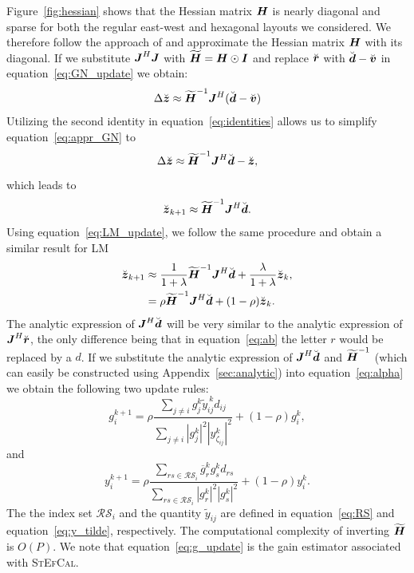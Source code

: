 \documentclass[useAMS,usenatbib]{mn2e}
\newcommand{\bz}{\bmath{z}}
\newcommand{\br}{\bmath{r}}
\newcommand{\bd}{\bmath{d}}
\newcommand{\bv}{\bmath{v}}
\newcommand{\bJ}{\bmath{J}}
\newcommand{\bH}{\bmath{H}}
\newcommand{\bI}{\bmath{I}}
\newcommand{\conj}[1]{\overline{#1}}
\begin{document}
Figure~\ref{fig:hessian} shows that the Hessian matrix $\bH$ is nearly diagonal and sparse for both the regular east-west and hexagonal layouts we considered. We therefore follow the approach of \citet{Smirnov2015} and approximate the Hessian matrix $\bH$ with its diagonal. If we substitute $\bJ^H\bJ$ with $\widetilde{\bH}=\bH\odot\bI$ and replace $\breve{\br}$ with $\breve{\bd} - \breve{\bv}$ in equation~\ref{eq:GN_update} we obtain:
\begin{equation}
\label{eq:appr_GN}
 \Delta \breve{\bz} \approx \widetilde{\bH}^{-1}\bJ^H(\breve{\bd}-\breve{\bv})
\end{equation}
Utilizing the second identity in equation~\ref{eq:identities} allows us to simplify equation~\ref{eq:appr_GN} to
\begin{equation}
  \Delta \breve{\bz} \approx \widetilde{\bH}^{-1}\bJ^H\breve{\bd}-\breve{\bz},
\end{equation}
which leads to
\begin{equation}
 \breve{\bz}_{k+1} \approx \widetilde{\bH}^{-1}\bJ^H\breve{\bd}.
\end{equation}
Using equation~\ref{eq:LM_update}, we follow the same procedure and obtain a similar result for LM
\begin{align}
\breve{\bz}_{k+1} &\approx \frac{1}{1+\lambda}\widetilde{\bH}^{-1}\bJ^H\breve{\bd} + \frac{\lambda}{1+\lambda} \breve{\bz}_k,\label{eq:lambda}\\
 &= \rho \widetilde{\bH}^{-1}\bJ^H\breve{\bd} + (1-\rho)\breve{\bz}_k. \label{eq:alpha}  
\end{align}
The analytic expression of $\bJ^H\breve{\bd}$ will be very similar to the analytic 
expression of $\bJ^H\breve{\br}$, the only difference being that in equation~\ref{eq:ab} the letter $r$ would be replaced by a $d$. If we substitute the analytic expression
of $\bJ^H\breve{\bd}$ and $\widetilde{\bH}^{-1}$ (which can easily be constructed using Appendix~\ref{sec:analytic}) into equation~\ref{eq:alpha} we obtain the following two update rules:
\begin{equation}
\label{eq:g_update}
g_{i}^{k+1} = \rho \frac{\sum_{j\neq i} g_j^k \widetilde{y}_{ij}^{~\!\!k} d_{ij}}{\sum_{j\neq i} |g_j^k|^2|y_{\zeta_{ij}}^k|^2} + (1-\rho) g_i^k, 
\end{equation}
and
\begin{equation}
\label{eq:y_update}
y_{i}^{k+1} = \rho \frac{\sum_{rs \in \mathcal{RS}_i} \conj{g}_r^k g_s^k d_{rs}}{\sum_{rs \in \mathcal{RS}_i}|g_r^k|^2|g_s^k|^2} + (1-\rho) y_i^k. 
\end{equation}
The the index set $\mathcal{RS}_i$ and the quantity $\widetilde{y}_{ij}$ are defined in equation~\ref{eq:RS} and equation~\ref{eq:y_tilde}, respectively. 
The computational complexity of inverting $\widetilde{\bH}$ is $O(P)$. We note that equation~\ref{eq:g_update} is the gain estimator associated with \textsc{StEfCal}.
\end{document}
